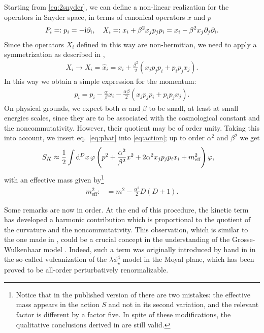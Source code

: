 \documentclass[a4paper,10pt]{amsart}
\begin{document}
Starting from \eqref{eq:2snyder}, we can define a non-linear realization for the operators in Snyder space, in terms of canonical operators $x$ and $p$
\begin{align}\label{eq:2canonical}
 P_i=:p_i=-{\rm i}\partial_i, \quad X_i=:x_i+\beta^2x_jp_jp_i=x_i-\beta^2x_j\partial_j\partial_i.
\end{align}
Since the operators $X_i$ defined in this way are non-hermitian, we need to apply a symmetrization as described in \cite{Meljanac:2017ikx},
\begin{align}\label{eq:symmetrization}
 X_i\rightarrow X_i=\hat x_i=x_i+\frac{\beta^2}{2} (x_jp_jp_i+p_ip_jx_j).
\end{align}
In this way we obtain a simple expression for the momentum:
\begin{align}\label{eq:phat}
 \hat{p}_i=p_i-\frac{\alpha}{\beta} x_i-\frac{\alpha \beta}{2} (x_jp_jp_i+p_ip_jx_j).
\end{align}
On physical grounds, we expect both $\alpha$ and $\beta$ to be small,
at least at small energies scales, since they are to be associated with the cosmological constant and the noncommutativity.
However, their quotient may be of order unity.
Taking this into account, we insert eq.~\eqref{eq:phat} into \eqref{eq:action};
up to order $\alpha^2$ and $\beta^2$ we get
\begin{align}\label{eq:kinetic}
 \begin{split}
S_K&\approx
 \frac{1}{2}\int {\rm d}^Dx \,\varphi\, \Bigg(p^2+\frac{\alpha^2}{\beta^2}x^2
 +2\alpha^2 x_jp_jp_ix_i+ m^2_{\text{eff}}\Bigg)\, \varphi,
 \end{split}
\end{align}
with an effective mass given by\footnote{Notice that in the published version of \cite{Franchino-Vinas:2019nqy} there are two mistakes: the effective mass appears in the action $S$ and not in its second variation, and the relevant factor is different by a factor five.
In spite of these modifications, the qualitative conclusions derived in \cite{Franchino-Vinas:2019nqy} are still valid.}
\begin{align}
 \label{eq:meff}
 m^2_{\text{eff}}:&=m^2-\frac{\alpha^2}{2}D(D+1).
\end{align}

Some remarks are now in order. At the end of this procedure,
the kinetic term has developed a harmonic contribution which is proportional to the quotient of the curvature and the noncommutativity.
This observation, which is similar to the one made in \cite{Buric:2009ss}, could be a crucial concept in the understanding of the Grosse-Wulkenhaar model \cite{Grosse:2005da}.
Indeed, such a term was originally introduced by hand in \cite{Grosse:2005da} in the so-called vulcanization of the $\lambda\phi^4_{\star}$ model in the Moyal plane, which has been proved to be all-order perturbatively renormalizable.
\end{document}
